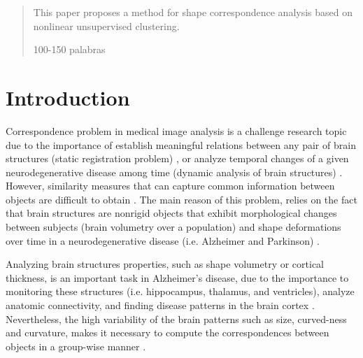 \documentclass[twoside]{article}
\begin{document}
%

%
\begin{abstract}
This paper proposes a method for shape correspondence analysis based on nonlinear unsupervised clustering. 

100-150 palabras 
\end{abstract}
%
%
\section{Introduction}
\label{sec:intro}

Correspondence problem in medical image analysis is a challenge research topic due to the importance of establish meaningful relations between any pair of brain structures (static registration problem) \cite{LinCW14}, or analyze temporal changes of a given neurodegenerative disease among time (dynamic analysis of brain structures) \cite{durrleman2014}. However, similarity measures that can capture common information between objects are difficult to obtain \cite{CortesS15}. The main reason of this problem, relies on the fact that brain structures are nonrigid objects that exhibit morphological changes between subjects (brain volumetry over a population) and shape deformations over time in a neurodegenerative disease (i.e. Alzheimer and Parkinson) \cite{Cosa13}.

Analyzing brain structures properties, such as shape volumetry or cortical thickness, is an important task in Alzheimer's disease, due to the importance to monitoring these structures (i.e. hippocampus, thalamus, and ventricles), analyze anatomic connectivity, and finding disease patterns in the brain cortex \cite{Thompson03,Derek10}. Nevertheless, the high variability of the brain patterns such as size, curved-ness and curvature, makes it necessary to compute the correspondences between objects in a group-wise manner \cite{Sidorov11}.
\end{document}
